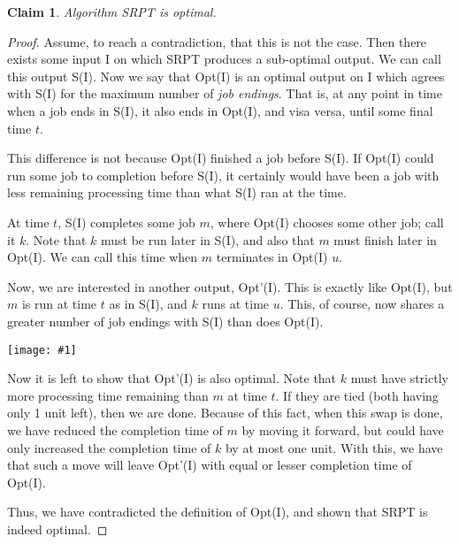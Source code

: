 \documentclass{article}
\newtheorem{thm}{Claim}
\providecommand{\image}[1]{
    \begin{center}
        \texttt{[image: \#1]}
    \end{center}
}
\begin{document}
    \begin{thm}
        Algorithm SRPT is optimal.
    \end{thm}
    \begin{proof}
        Assume, to reach a contradiction, that this is not the case.
        Then there exists some input I on which SRPT produces a sub-optimal output.
        We can call this output S(I).
        Now we say that Opt(I) is an optimal output on I which agrees with S(I) for the maximum number of \emph{job endings}.
        That is, at any point in time when a job ends in S(I), it also ends in Opt(I), and visa versa, until some final time $t$.

        This difference is not because Opt(I) finished a job before S(I).
        If Opt(I) could run some job to completion before S(I), it certainly would have been a job with less remaining processing time than what S(I) ran at the time.

        At time $t$, S(I) completes some job $m$, where Opt(I) chooses some other job; call it $k$.
        Note that $k$ must be run later in S(I), and also that $m$ must finish later in Opt(I).
        We can call this time when $m$ terminates in Opt(I) $u$.

        Now, we are interested in another output, Opt'(I).
        This is exactly like Opt(I), but $m$ is run at time $t$ as in S(I), and $k$ runs at time $u$.
        This, of course, now shares a greater number of job endings with S(I) than does Opt(I).

        \image{p10btable}

        Now it is left to show that Opt'(I) is also optimal.
        Note that $k$ must have strictly more processing time remaining than $m$ at time $t$.
        If they are tied (both having only 1 unit left), then we are done.
        Because of this fact, when this swap is done, we have reduced the completion time of $m$ by moving it forward, but could have only increased the completion time of $k$ by at most one unit.
        With this, we have that such a move will leave Opt'(I) with equal or lesser completion time of Opt(I).

        Thus, we have contradicted the definition of Opt(I), and shown that SRPT is indeed optimal.
    \end{proof}
\end{document}
